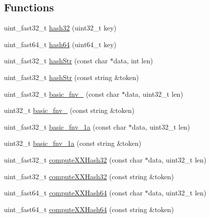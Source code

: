 \subsection*{Functions}
\begin{DoxyCompactItemize}
\item 
uint\+\_\+fast32\+\_\+t \hyperlink{namespaceuva_1_1smt_1_1hashing_a1122f9cea7a46ff058d6e1d1a956ad5c}{hash32} (uint32\+\_\+t key)
\item 
uint\+\_\+fast64\+\_\+t \hyperlink{namespaceuva_1_1smt_1_1hashing_ab2ab5c0482dae95dd76bf3380d064fa2}{hash64} (uint64\+\_\+t key)
\item 
uint\+\_\+fast32\+\_\+t \hyperlink{namespaceuva_1_1smt_1_1hashing_aa43fdcfec1c39ef1651c37a01ea6d239}{hash\+Str} (const char $\ast$data, int len)
\item 
uint\+\_\+fast32\+\_\+t \hyperlink{namespaceuva_1_1smt_1_1hashing_a05470691cb4fdaa03ae388a92cae3c8e}{hash\+Str} (const string \&token)
\item 
uint\+\_\+fast32\+\_\+t \hyperlink{namespaceuva_1_1smt_1_1hashing_ab58ee6072dad2326f67f8a90e62238b6}{basic\+\_\+fnv\+\_} (const char $\ast$data, uint32\+\_\+t len)
\item 
uint32\+\_\+t \hyperlink{namespaceuva_1_1smt_1_1hashing_a801a5a0fcbdd5ce27d8cdb0b61a48325}{basic\+\_\+fnv\+\_} (const string \&token)
\item 
uint\+\_\+fast32\+\_\+t \hyperlink{namespaceuva_1_1smt_1_1hashing_adfac598555f7bc1c5f977534d8c0489b}{basic\+\_\+fnv\+\_\+1a} (const char $\ast$data, uint32\+\_\+t len)
\item 
uint32\+\_\+t \hyperlink{namespaceuva_1_1smt_1_1hashing_ab7815ccec4356d786ef65bb512dca9dd}{basic\+\_\+fnv\+\_\+1a} (const string \&token)
\item 
uint\+\_\+fast32\+\_\+t \hyperlink{namespaceuva_1_1smt_1_1hashing_ab5657e6a0476111854d640e62043c91c}{compute\+X\+X\+Hash32} (const char $\ast$data, uint32\+\_\+t len)
\item 
uint\+\_\+fast32\+\_\+t \hyperlink{namespaceuva_1_1smt_1_1hashing_a074c1b5bc4c4b1d69c28bb100bae6729}{compute\+X\+X\+Hash32} (const string \&token)
\item 
uint\+\_\+fast64\+\_\+t \hyperlink{namespaceuva_1_1smt_1_1hashing_a481534e67432cc3f5a8a35970b351458}{compute\+X\+X\+Hash64} (const char $\ast$data, uint32\+\_\+t len)
\item 
uint\+\_\+fast64\+\_\+t \hyperlink{namespaceuva_1_1smt_1_1hashing_adc422e2a0504d94933794bb1639398fe}{compute\+X\+X\+Hash64} (const string \&token)
\item 

\end{DoxyCompactItemize}

